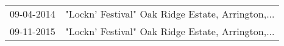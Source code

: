 \begin{supertabular}{ll}
 09-04-2014 &  "Lockn' Festival" Oak Ridge Estate, Arrington,... \\
 09-11-2015 &  "Lockn' Festival" Oak Ridge Estate, Arrington,... \\
\end{supertabular}
